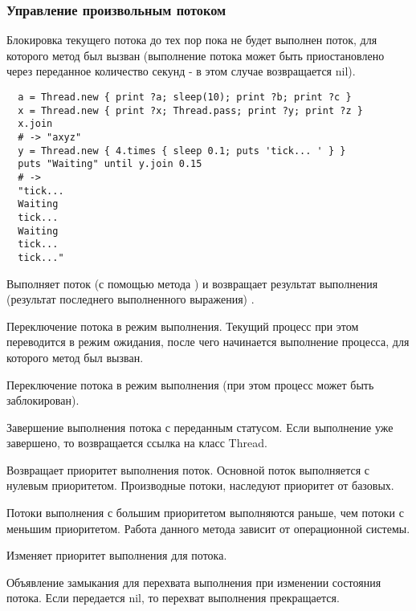 \subsubsection*{Управление произвольным потоком}

\begin{methodlist}
  Блокировка текущего потока до тех пор пока не будет выполнен поток, для которого метод был вызван (выполнение потока может быть приостановлено через переданное количество секунд - в этом случае возвращается nil).
  \begin{verbatim}
  a = Thread.new { print ?a; sleep(10); print ?b; print ?c } 
  x = Thread.new { print ?x; Thread.pass; print ?y; print ?z } 
  x.join 
  # -> "axyz" 
  y = Thread.new { 4.times { sleep 0.1; puts 'tick... ' } } 
  puts "Waiting" until y.join 0.15 
  # -> 
  "tick... 
  Waiting 
  tick... 
  Waiting 
  tick... 
  tick..."
  \end{verbatim}

  Выполняет поток (с помощью метода ) и возвращает результат выполнения (результат последнего выполненного выражения) .

  Переключение потока в режим выполнения. Текущий процесс при этом переводится в режим ожидания, после чего начинается выполнение процесса, для которого метод был вызван. 

  Переключение потока в режим выполнения (при этом процесс может быть заблокирован).

  Завершение выполнения потока с переданным статусом. Если выполнение уже завершено, то возвращается ссылка на класс Thread. 
 
  Возвращает приоритет выполнения поток. Основной поток выполняется с нулевым приоритетом. Производные потоки, наследуют приоритет от базовых. 

  Потоки выполнения с большим приоритетом выполняются раньше, чем потоки с меньшим приоритетом. Работа данного метода зависит от операционной системы. 

  Изменяет приоритет выполнения для потока.

  Объявление замыкания для перехвата выполнения при изменении состояния потока. Если передается nil, то перехват выполнения прекращается.
\end{methodlist}


